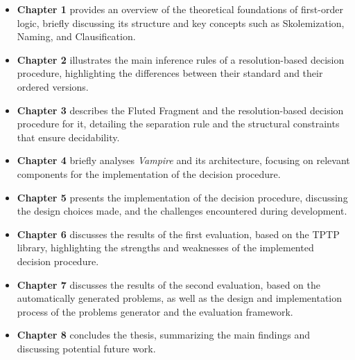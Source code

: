 \begin{itemize}
    \item \textbf{Chapter 1} provides an overview of the theoretical foundations of first-order logic, briefly discussing its structure and key concepts such as Skolemization, Naming, and Clausification.
    \item \textbf{Chapter 2} illustrates the main inference rules of a resolution-based decision procedure, highlighting the differences between their standard and their ordered versions.
    \item \textbf{Chapter 3} describes the Fluted Fragment and the resolution-based decision procedure for it, detailing the separation rule and the structural constraints that ensure decidability.
    \item \textbf{Chapter 4} briefly analyses \textit{Vampire} and its architecture, focusing on relevant components for the implementation of the decision procedure.
    \item \textbf{Chapter 5} presents the implementation of the decision procedure, discussing the design choices made, and the challenges encountered during development.
    \item \textbf{Chapter 6} discusses the results of the first evaluation, based on the TPTP library, highlighting the strengths and weaknesses of the implemented decision procedure.
    \item \textbf{Chapter 7} discusses the results of the second evaluation, based on the automatically generated problems, as well as the design and implementation process of the problems generator and the evaluation framework.
    \item \textbf{Chapter 8} concludes the thesis, summarizing the main findings and discussing potential future work.
\end{itemize}



